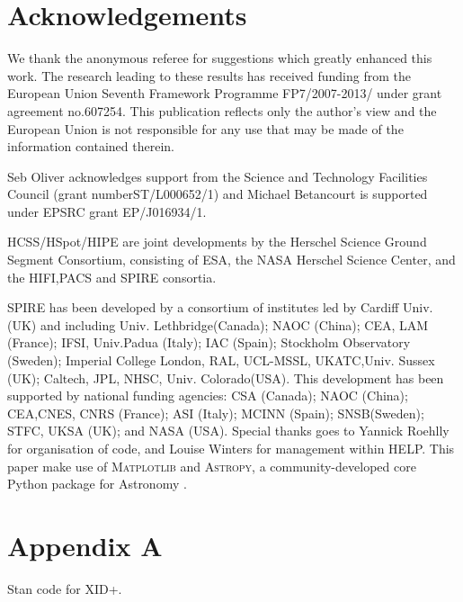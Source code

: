 \documentclass[useAMS,usenatbib]{mnras}
\begin{document}
\section*{Acknowledgements}%
We thank the anonymous referee for suggestions which greatly enhanced this work. The research leading to these results has received funding from the European Union Seventh Framework Programme FP7/2007-2013/ under grant agreement no.607254. This publication reflects only the author's view and the European Union is not responsible for any use that may be made of the information contained therein. 

Seb Oliver acknowledges support from the Science and Technology Facilities Council (grant numberST/L000652/1) and Michael Betancourt is supported under EPSRC grant EP/J016934/1.

HCSS/HSpot/HIPE are joint developments by the Herschel Science Ground Segment Consortium, consisting of ESA, the NASA Herschel Science Center, and the HIFI,PACS and SPIRE consortia.

SPIRE has been developed by a consortium of institutes led by Cardiff Univ. (UK) and including Univ. Lethbridge(Canada); NAOC (China); CEA, LAM (France); IFSI, Univ.Padua (Italy); IAC (Spain); Stockholm Observatory (Sweden); Imperial College London, RAL, UCL-MSSL, UKATC,Univ.  Sussex  (UK);  Caltech, JPL, NHSC, Univ.  Colorado(USA).  This development has been supported by national funding agencies: CSA (Canada); NAOC (China);  CEA,CNES, CNRS (France); ASI (Italy); MCINN (Spain); SNSB(Sweden); STFC, UKSA (UK); and NASA (USA).
Special thanks goes to Yannick Roehlly for organisation of code, and Louise Winters for management within HELP. This paper make use of \textsc{Matplotlib} \citep{Hunter:2007} and \textsc{Astropy}, a community-developed core Python package for Astronomy \citep{Astropy-Collaboration:2013}. 

%
%

\appendix
\renewcommand{\thefigure}{A\arabic{figure}}

\setcounter{figure}{0}
\section*{Appendix A}\label{Stan_model}
\onecolumn
Stan code for XID+.

\end{document}
